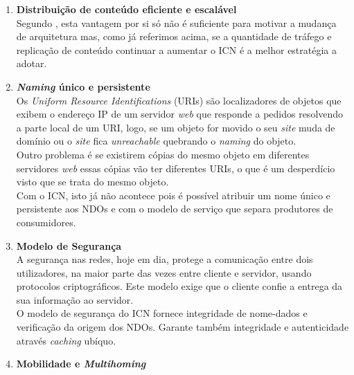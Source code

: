 \documentclass[conference]{IEEEtran}
\begin{document}
\begin{enumerate}
\item \textbf{Distribui\c{c}\~{a}o de conte\'{u}do eficiente e escal\'{a}vel} \\

Segundo \cite{icnForest}, esta vantagem por si s\'{o} n\~{a}o \'{e} suficiente para motivar a mudan\c{c}a de arquitetura mas, como j\'{a} referimos acima, se a quantidade de tr\'{a}fego e replica\c{c}\~{a}o de conte\'{u}do continuar a aumentar o ICN \'{e} a melhor estrat\'{e}gia a adotar. \\

\item \textbf{\textit{Naming} \'{u}nico e persistente}\\

Os \textit{Uniform Resource Identifications} (URIs) s\~{a}o localizadores de objetos que exibem o endere\c{c}o IP de um servidor \textit{web} que responde a pedidos resolvendo a parte local de um URI, logo, se um objeto for movido o seu \textit{site} muda de dom\'{i}nio ou o \textit{site} fica \textit{unreachable} quebrando o \textit{naming} do objeto.\\
Outro problema \'{e} se existirem c\'{o}pias do mesmo objeto em diferentes servidores \textit{web} essas c\'{o}pias v\~{a}o ter diferentes URIs, o que \'{e} um desperd\'{i}cio visto que se trata do mesmo objeto.\\

Com o ICN, isto j\'{a} n\~{a}o acontece pois \'{e} poss\'{i}vel atribuir um nome \'{u}nico e persistente aos NDOs e com o modelo de servi\c{c}o que separa produtores de consumidores.
\\

\item \textbf{Modelo de Seguran\c{c}a}\\

A seguran\c{c}a nas redes, hoje em dia, protege a comunica\c{c}\~{a}o entre dois utilizadores, na maior parte das vezes entre cliente e servidor, usando protocolos criptogr\'{a}ficos. Este modelo exige que o cliente confie a entrega da sua informa\c{c}\~{a}o ao servidor.\\

O modelo de seguran\c{c}a do ICN fornece integridade de nome-dados e verifica\c{c}\~{a}o da origem dos NDOs. Garante tamb\'{e}m integridade e autenticidade atrav\'{e}s \textit{caching} ub\'{i}quo.\\ 

\item \textbf{Mobilidade e \textit{Multihoming}}\\


\end{enumerate}
\end{document}
